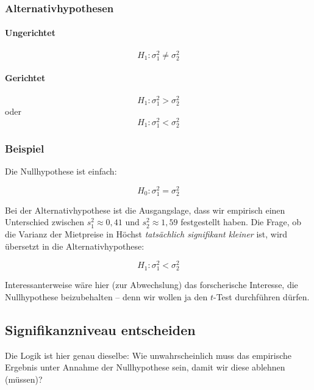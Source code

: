 \documentclass[
  11pt,
  ngerman,
  a4paper,
]{report}
\begin{document}
\hypertarget{alternativhypothesen}{%
\subsubsection{Alternativhypothesen}\label{alternativhypothesen}}

\hypertarget{ungerichtet}{%
\paragraph{Ungerichtet}\label{ungerichtet}}

\[
H_1: \sigma^2_1\neq\sigma^2_2
\label{eq:h1uf}
\]

\hypertarget{gerichtet}{%
\paragraph{Gerichtet}\label{gerichtet}}

\[
H_1: \sigma^2_1>\sigma^2_2
\label{eq:h1gf}
\]
oder
\[
H_1: \sigma^2_1<\sigma^2_2
\label{eq:h1lf}
\]

\hypertarget{beispiel-18}{%
\subsubsection{Beispiel}\label{beispiel-18}}

Die Nullhypothese ist einfach:

\[
H_0: \sigma^2_1=\sigma^2_2
\]

Bei der Alternativhypothese ist die Ausgangslage, dass wir empirisch einen Unterschied zwischen \(s^2_1\approx0{,}41\) und \(s^2_2\approx1{,}59\) festgestellt haben. Die Frage, ob die Varianz der Mietpreise in Höchst \emph{tatsächlich signifikant kleiner} ist, wird übersetzt in die Alternativhypothese:

\[
H_1: \sigma^2_1<\sigma^2_2
\]

Interessanterweise wäre hier (zur Abwechslung) das forscherische Interesse, die Nullhypothese beizubehalten -- denn wir wollen ja den \(t\)-Test durchführen dürfen.

\hypertarget{signifikanzniveau-entscheiden-3}{%
\subsection{Signifikanzniveau entscheiden}\label{signifikanzniveau-entscheiden-3}}

Die Logik ist hier genau dieselbe: Wie unwahrscheinlich muss das empirische Ergebnis unter Annahme der Nullhypothese sein, damit wir diese ablehnen (müssen)?
\end{document}
